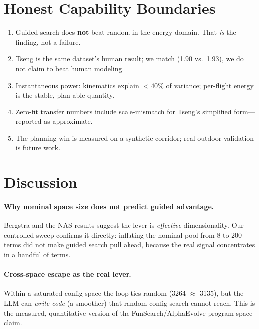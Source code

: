\documentclass{article}
\begin{document}
\section{Honest Capability Boundaries}
\label{sec:boundaries}
\begin{enumerate}
  \item Guided search does \textbf{not} beat random in the energy domain. That \emph{is}
    the finding, not a failure.
  \item Tseng is the same dataset's human result; we match (1.90 vs.\ 1.93), we do not
    claim to beat human modeling.
  \item Instantaneous power: kinematics explain $<40\%$ of variance; per-flight energy is
    the stable, plan-able quantity.
  \item Zero-fit transfer numbers include scale-mismatch for Tseng's simplified form---
    reported as approximate.
  \item The planning win is measured on a synthetic corridor; real-outdoor validation is
    future work.
\end{enumerate}

\section{Discussion}
\label{sec:disc}
\paragraph{Why nominal space size does not predict guided advantage.} Bergstra and the
NAS results suggest the lever is \emph{effective} dimensionality. Our controlled sweep
confirms it directly: inflating the nominal pool from 8 to 200 terms did not make guided
search pull ahead, because the real signal concentrates in a handful of terms.

\paragraph{Cross-space escape as the real lever.} Within a saturated config space the
loop ties random (3264 $\approx$ 3135), but the LLM can \emph{write code} (a smoother)
that random config search cannot reach. This is the measured, quantitative version of the
FunSearch/AlphaEvolve program-space claim.
\end{document}
